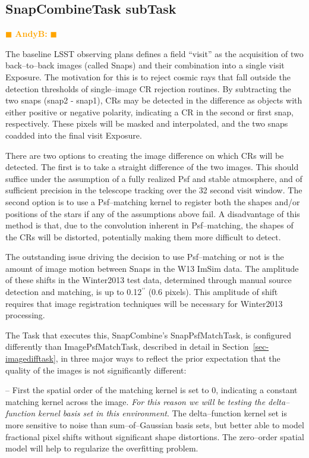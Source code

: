 \documentclass[12pt]{article}
\def\arcsec{^{\prime\prime}}
\newcommand{\becker} { \textcolor{orange} {
\ensuremath{\blacksquare} {\bf AndyB:}  
\ensuremath{\blacksquare} } }
\begin{document}
\subsection{SnapCombineTask subTask} \becker

The baseline LSST observing plans defines a field ``visit'' as the
acquisition of two back--to--back images (called Snaps) and their
combination into a single visit Exposure.  The motivation for this is
to reject cosmic rays that fall outside the detection thresholds of
single--image CR rejection routines.  By subtracting the two snaps
(snap2 - snap1), CRs may be detected in the difference as objects with
either positive or negative polarity, indicating a CR in the second or
first snap, respectively.  These pixels will be masked and
interpolated, and the two snaps coadded into the final visit Exposure.

There are two options to creating the image difference on which CRs
will be detected.  The first is to take a straight difference of the
two images.  This should suffice under the assumption of a fully
realized Psf and stable atmosphere, and of sufficient precision in the
telescope tracking over the 32 second visit window.  The second option
is to use a Psf--matching kernel to register both the shapes and/or
positions of the stars if any of the assumptions above fail.  A
disadvantage of this method is that, due to the convolution inherent
in Psf--matching, the shapes of the CRs will be distorted, potentially
making them more difficult to detect.

The outstanding issue driving the decision to use Psf--matching or not
is the amount of image motion between Snaps in the W13 ImSim data.
The amplitude of these shifts in the Winter2013 test data, determined
through manual source detection and matching, is up to 0.12$\arcsec$
(0.6 pixels).  This amplitude of shift requires that image
registration techniques will be necessary for Winter2013 processing.

The Task that executes this, SnapCombine's SnapPsfMatchTask, is
configured differently than ImagePsfMatchTask, described in detail in
Section~\ref{sec-imagedifftask}, in three major ways to reflect the
prior expectation that the quality of the images is not significantly
different:

-- First the spatial order of the matching kernel is set to 0,
indicating a constant matching kernel across the image.  {\it For this
  reason we will be testing the delta--function kernel basis set in
  this environment}.  The delta--function kernel set is more sensitive
to noise than sum--of--Gaussian basis sets, but better able to model
fractional pixel shifts without significant shape distortions.  The
zero--order spatial model will help to regularize the overfitting
problem.
\end{document}
